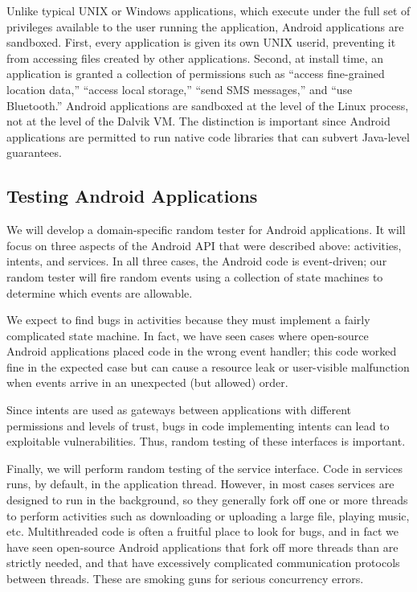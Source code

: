 Unlike typical UNIX or Windows applications, which execute under the
full set of privileges available to the user running the application,
Android applications are sandboxed.
%
First, every application is given its own UNIX userid, preventing
it from accessing files created by other applications.
%
Second, at install time, an application is granted a collection of
permissions such as ``access fine-grained location data,'' ``access
local storage,'' ``send SMS messages,'' and ``use Bluetooth.''
%
Android applications are sandboxed at the level of the Linux
process, not at the level of the Dalvik VM\@.
%
The distinction is important since Android applications are permitted
to run native code libraries that can subvert Java-level guarantees.


\subsection{Testing Android Applications}

We will develop a domain-specific random tester for Android
applications.
%
It will focus on three aspects of the Android API that were
described above: activities, intents, and services.
%
In all three cases, the Android code is event-driven; our random
tester will fire random events using a collection of state machines to
determine which events are allowable.


We expect to find bugs in activities because they must implement
a fairly complicated state machine.
%
In fact, we have seen cases where open-source Android applications
placed code in the wrong event handler; this code worked fine in the
expected case but can cause a resource leak or user-visible
malfunction when events arrive in an unexpected (but allowed) order.


Since intents are used as gateways between applications with different
permissions and levels of trust, bugs in code implementing intents can
lead to exploitable vulnerabilities.
%
Thus, random testing of these interfaces is important.


Finally, we will perform random testing of the service interface.
%
Code in services runs, by default, in the application thread.
%
However, in most cases services are designed to run in the background,
so they generally fork off one or more threads to perform activities
such as downloading or uploading a large file, playing music, etc.
%
Multithreaded code is often a fruitful place to look for bugs, and in
fact we have seen open-source Android applications that fork off more
threads than are strictly needed, and that have excessively
complicated communication protocols between threads.
%
These are smoking guns for serious concurrency errors.


